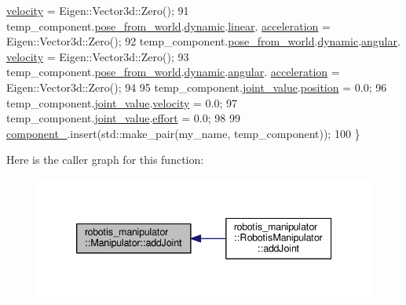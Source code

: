 \begin{DoxyCode}
      \hyperlink{structrobotis__manipulator_1_1_dynamicvector_a6bbccf8316887a8da3cd6aa065f3beac}{velocity} = Eigen::Vector3d::Zero();
91   temp\_component.\hyperlink{structrobotis__manipulator_1_1_component_a0b28dd5fe885ff8f07d75733d6e777fc}{pose\_from\_world}.\hyperlink{structrobotis__manipulator_1_1_pose_a8accf10d21933e07ade2728fcccf4ae6}{dynamic}.\hyperlink{structrobotis__manipulator_1_1_dynamic_pose_a45f314d8e2d3f78a4bc9c2aa72f0badc}{linear}.
      \hyperlink{structrobotis__manipulator_1_1_dynamicvector_afc83eba2d67af4c23150a08824f0f01e}{acceleration} = Eigen::Vector3d::Zero();
92   temp\_component.\hyperlink{structrobotis__manipulator_1_1_component_a0b28dd5fe885ff8f07d75733d6e777fc}{pose\_from\_world}.\hyperlink{structrobotis__manipulator_1_1_pose_a8accf10d21933e07ade2728fcccf4ae6}{dynamic}.\hyperlink{structrobotis__manipulator_1_1_dynamic_pose_a424459b0d1108f1e65594f5d193cbae6}{angular}.
      \hyperlink{structrobotis__manipulator_1_1_dynamicvector_a6bbccf8316887a8da3cd6aa065f3beac}{velocity} = Eigen::Vector3d::Zero();
93   temp\_component.\hyperlink{structrobotis__manipulator_1_1_component_a0b28dd5fe885ff8f07d75733d6e777fc}{pose\_from\_world}.\hyperlink{structrobotis__manipulator_1_1_pose_a8accf10d21933e07ade2728fcccf4ae6}{dynamic}.\hyperlink{structrobotis__manipulator_1_1_dynamic_pose_a424459b0d1108f1e65594f5d193cbae6}{angular}.
      \hyperlink{structrobotis__manipulator_1_1_dynamicvector_afc83eba2d67af4c23150a08824f0f01e}{acceleration} = Eigen::Vector3d::Zero();
94 
95   temp\_component.\hyperlink{structrobotis__manipulator_1_1_component_a06de8406b177d397a1f998fdf9d67d95}{joint\_value}.\hyperlink{structrobotis__manipulator_1_1_point_a0f122386b502d9b316bdead542ed2145}{position} = 0.0;
96   temp\_component.\hyperlink{structrobotis__manipulator_1_1_component_a06de8406b177d397a1f998fdf9d67d95}{joint\_value}.\hyperlink{structrobotis__manipulator_1_1_point_a4eaec95fac0c755eb0aa704b36ebe97b}{velocity} = 0.0;
97   temp\_component.\hyperlink{structrobotis__manipulator_1_1_component_a06de8406b177d397a1f998fdf9d67d95}{joint\_value}.\hyperlink{structrobotis__manipulator_1_1_point_add1a7019fc87cc2ac9bdf033372a9bb6}{effort} = 0.0;
98 
99   \hyperlink{classrobotis__manipulator_1_1_manipulator_a20b388b821f161972c2cf737fe1c26db}{component\_}.insert(std::make\_pair(my\_name, temp\_component));
100 \}
\end{DoxyCode}


Here is the caller graph for this function\+:\nopagebreak
\begin{figure}[H]
\begin{center}
\leavevmode
\includegraphics[width=339pt]{classrobotis__manipulator_1_1_manipulator_a55c49ab2eb46afd6595ad9de306042b1_icgraph}
\end{center}
\end{figure}


